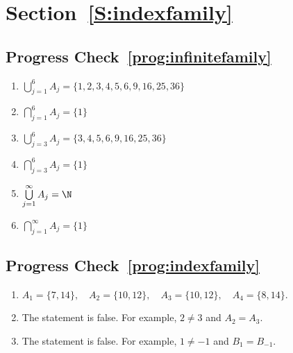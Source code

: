 \section*{Section~\ref{S:indexfamily}}

\subsection*{Progress Check~\ref{prog:infinitefamily}}
\begin{minipage}{3in}
\begin{enumerate}
\item $\bigcup\limits_{j=1}^{6}A_j = \{1, 2, 3, 4, 5, 6, 9, 16, 25, 36 \}$ \hspace{6pt}
\item $\bigcap\limits_{j=1}^{6}A_j = \{ 1 \}$
\item $\bigcup\limits_{j=3}^{6}A_j = \{3, 4, 5, 6, 9, 16, 25, 36 \}$
\end{enumerate}
\end{minipage}
\begin{minipage}{1.6in}
\begin{enumerate} \setcounter{enumi}{3}
\item $\bigcap\limits_{j=3}^{6}A_j = \{ 1 \}$
\item $\bigcup\limits_{j=1}^{\infty}A_j = \N$
\item $\bigcap\limits_{j=1}^{\infty}A_j = \{ 1 \}$
\end{enumerate}
\end{minipage}




\subsection*{Progress Check~\ref{prog:indexfamily}}
\begin{enumerate}
  \item $A_1 = \{7, 14 \}, \quad A_2 = \{10, 12 \}, \quad A_3 = \{10, 12 \}, \quad A_4 = \{8, 14 \}$.
  \item The statement is false.  For example, $2 \ne 3$ and $A_2 = A_3$.
  \item The statement is false.  For example, $1 \ne -1$ and $B_1 = B_{-1}$.
\end{enumerate}




